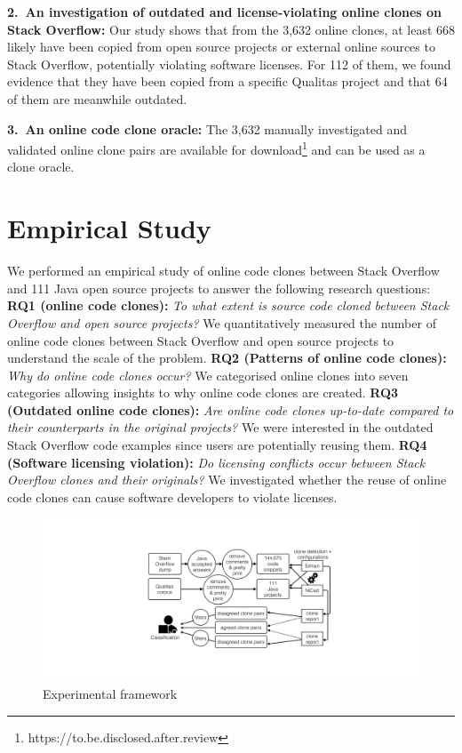 \documentclass[sigconf,review, anonymous]{acmart}
\begin{document}
\vspace{0.5ex}%
\noindent\textbf{2.~An investigation of outdated and license-violating
  online clones on Stack Overflow:} Our study shows that from the
3,632 online clones, at least 668 likely have been copied from open
source projects or external online sources to Stack Overflow,
potentially violating software licenses. For 112 of them, we found
evidence that they have been copied from a specific Qualitas project
and that 64 of them are meanwhile outdated.

\vspace{0.5ex}%
\noindent\textbf{3.~An online code clone oracle:} The 3,632 manually
investigated and validated online clone pairs are available for
download\footnote{https://to.be.disclosed.after.review} and can be
used as a clone oracle.

\section{Empirical Study}

We performed an empirical study of online code clones between Stack
Overflow and 111 Java open source projects to answer the following
research questions: \\
%
\textbf{RQ1 (online code clones):} \textit{To what extent is source
  code cloned between Stack Overflow and open source projects?} We
quantitatively measured the number of online code clones between Stack
Overflow and open source projects to understand the scale of the
problem. \newline 
%
\textbf{RQ2 (Patterns of online code clones):} \textit{Why do online
  code clones occur?} We categorised online clones into seven
categories allowing insights to why online code clones are created.
\newline
%
\textbf{RQ3 (Outdated online code clones):} \textit{Are
  online code clones up-to-date compared to their counterparts in the
  original projects?} We were interested in the outdated Stack
Overflow code examples since users are potentially reusing
them. \newline
%
\textbf{RQ4 (Software licensing violation):} \textit{Do
  licensing conflicts occur between Stack Overflow clones and their
  originals?} We investigated whether the reuse of online code clones
can cause software developers to violate licenses.

\begin{figure}
  \centering
  \includegraphics[width=\linewidth]{exp_framework_new}
  \caption{Experimental framework}
  \label{fig:exp_framework}
\end{figure}
\end{document}
